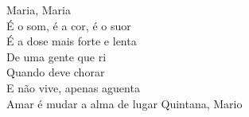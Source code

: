 \begin{otherlanguage}{english}

\begin{flushright}

Maria, Maria\\
É o som, é a cor, é o suor\\
É a dose mais forte e lenta\\
De uma gente que ri\\
Quando deve chorar\\
E não vive, apenas aguenta\\

 
Amar é mudar a alma de lugar
Quintana, Mario
\end{flushright}
\end{otherlanguage}
